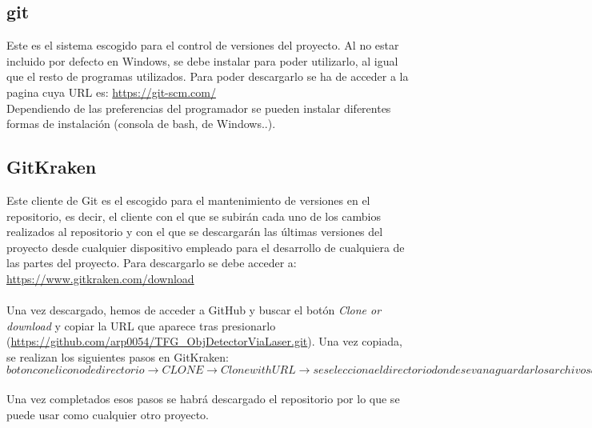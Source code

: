 \subsection{git}
Este es el sistema escogido para el control de versiones del proyecto. Al no estar incluido por defecto en Windows, se debe instalar para poder utilizarlo, al igual que el resto de programas utilizados. Para poder descargarlo se ha de acceder a la pagina cuya URL es: \url{https://git-scm.com/}\\
Dependiendo de las preferencias del programador se pueden instalar diferentes formas de instalación (consola de bash, de Windows..).

\subsection{GitKraken}
Este cliente de Git es el escogido para el mantenimiento de versiones en el repositorio, es decir, el cliente con el que se subirán cada uno de los cambios realizados al repositorio y con el  que se descargarán las últimas versiones del proyecto desde cualquier dispositivo empleado para el desarrollo de cualquiera de las partes del proyecto. Para descargarlo se debe acceder a: \url{https://www.gitkraken.com/download}\\
\\
Una vez descargado, hemos de acceder a GitHub y buscar el botón \textit{Clone or download} y copiar la URL que aparece tras presionarlo (\url{https://github.com/arp0054/TFG_ObjDetectorViaLaser.git}). Una vez copiada, se realizan los siguientes pasos en GitKraken: $boton con el icono de directorio \rightarrow CLONE \rightarrow Clone with URL \rightarrow se selecciona el directorio donde se van a guardar los archivos del directorio en el PC \rightarrow se pega la URL previamente copiada \rightarrow Clone repo! $\\
\\
Una vez completados esos pasos se habrá descargado el repositorio por lo que se puede usar como cualquier otro proyecto.\\

